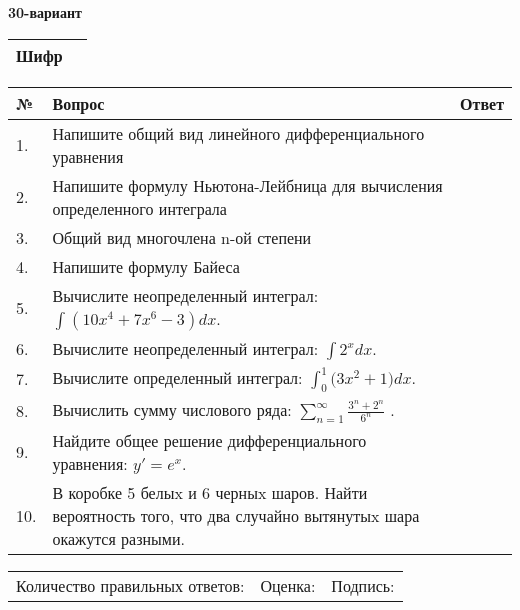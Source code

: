 \documentclass{article}
\begin{document}
  \egroup
  
  \newpage
  
  
  \textbf{30-вариант}\\
  
  \bgroup
  \def\arraystretch{1.6} %
  
  \begin{tabular}{|m{5.7cm}|m{9.5cm}|}
  \hline
  Шифр & \\
  \hline
  \end{tabular}
  
  \vspace{1cm}
  
  \begin{tabular}{|m{0.7cm}|m{10cm}|m{4cm}|}
  \hline
  № & Вопрос & Ответ \\
  \hline
  1. & Напишите общий вид линейного дифференциального уравнения &  \\
  \hline
  2. & Напишите формулу Ньютона-Лейбница для вычисления определенного интеграла &  \\
  \hline
  3. & Общий вид многочлена n-ой степени &  \\
  \hline
  4. & Напишите формулу Байеса &  \\
  \hline
  5. & Вычислите неопределенный интеграл: \(\int{\left( 10x^{4} + 7x^{6} - 3 \right)dx}\). &  \\
  \hline
  6. & Вычислите неопределенный интеграл: \(\int2^{x}dx\). &  \\
  \hline
  7. & Вычислите определенный интеграл: \(\int_{0}^{1}{(3x^{2}} + 1)dx\). &  \\
  \hline
  8. & Вычислить сумму числового ряда: \(\sum_{n = 1}^{\infty}\frac{3^{n} + 2^{n}}{6^{n}}\) . &  \\
  \hline
  9. & Найдите общее решение дифференциального уравнения: \(y' = e^{x}\). &  \\
  \hline
  10. & В коробке 5 белыx и 6 черныx шаров. Найти вероятность того, что два случайно вытянутыx шара окажутся разными. &  \\
  \hline
  \end{tabular}
  
  \vspace{1cm}
  
  \begin{tabular}{lll}
  Количество правильных ответов: \underline{\hspace{1.5cm}} & 
  Оценка: \underline{\hspace{1.5cm}} & 
  Подпись: \underline{\hspace{2cm}} \\
  \end{tabular}
  
\end{document}
